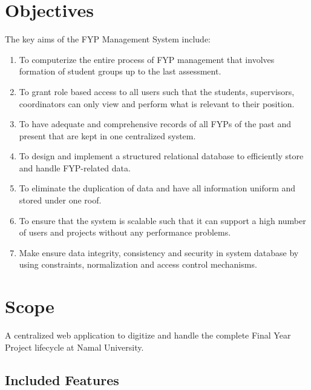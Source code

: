 \documentclass[12pt,a4paper]{report}
\begin{document}
\section{Objectives}
The key aims of the FYP Management System include:

\begin{enumerate}
    \item To computerize the entire process of FYP management that involves formation of student groups up to the last assessment.


    \item To grant role based access to all users such that the students, supervisors, coordinators  can only view and perform what is relevant to their position.



    \item To have adequate and comprehensive records of all FYPs of the past and present that are kept in one centralized system.
   
    \item To design and implement a structured relational database to efficiently store and handle FYP-related data.
  
    \item To eliminate the duplication of data and have all information uniform and stored under one roof.

    \item To ensure that the system is scalable such that it can support a high number of users and projects without any performance problems.

    \item Make ensure data integrity, consistency and security in system database by using  constraints, normalization and access control mechanisms.

 
\end{enumerate}

\section{Scope}

A centralized web application to digitize and handle the complete Final Year Project lifecycle at Namal University.

\subsection{Included Features}
\end{document}
